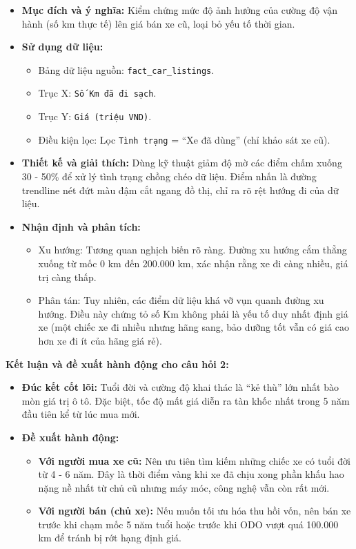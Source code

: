 \begin{itemize}
    \item \textbf{Mục đích và ý nghĩa:} Kiểm chứng mức độ ảnh hưởng của cường độ vận hành (số km thực tế) lên giá bán xe cũ, loại bỏ yếu tố thời gian.
    
    \item \textbf{Sử dụng dữ liệu:}
    \begin{itemize}
        \item Bảng dữ liệu nguồn: \texttt{fact\_car\_listings}.
        \item Trục X: \texttt{Số Km đã đi sạch}.
        \item Trục Y: \texttt{Giá (triệu VND)}.
        \item Điều kiện lọc: Lọc \texttt{Tình trạng} = ``Xe đã dùng'' (chỉ khảo sát xe cũ).
    \end{itemize}
    
    \item \textbf{Thiết kế và giải thích:} Dùng kỹ thuật giảm độ mờ các điểm chấm xuống 30 - 50\% để xử lý tình trạng chồng chéo dữ liệu. Điểm nhấn là đường trendline nét đứt màu đậm cắt ngang đồ thị, chỉ ra rõ rệt hướng đi của dữ liệu.
    
    \item \textbf{Nhận định và phân tích:}
    \begin{itemize}
        \item Xu hướng: Tương quan nghịch biến rõ ràng. Đường xu hướng cắm thẳng xuống từ mốc 0 km đến 200.000 km, xác nhận rằng xe đi càng nhiều, giá trị càng thấp.
        \item Phân tán: Tuy nhiên, các điểm dữ liệu khá vỡ vụn quanh đường xu hướng. Điều này chứng tỏ số Km không phải là yếu tố duy nhất định giá xe (một chiếc xe đi nhiều nhưng hãng sang, bảo dưỡng tốt vẫn có giá cao hơn xe đi ít của hãng giá rẻ).
    \end{itemize}
\end{itemize}

\noindent\textbf{Kết luận và đề xuất hành động cho câu hỏi 2:} 
\begin{itemize}
    \item \textbf{Đúc kết cốt lõi:} Tuổi đời và cường độ khai thác là ``kẻ thù'' lớn nhất bào mòn giá trị ô tô. Đặc biệt, tốc độ mất giá diễn ra tàn khốc nhất trong 5 năm đầu tiên kể từ lúc mua mới.
    \item \textbf{Đề xuất hành động:} 
    \begin{itemize}
        \item \textbf{Với người mua xe cũ:} Nên ưu tiên tìm kiếm những chiếc xe có tuổi đời từ 4 - 6 năm. Đây là thời điểm vàng khi xe đã chịu xong phần khấu hao nặng nề nhất từ chủ cũ nhưng máy móc, công nghệ vẫn còn rất mới.
        \item \textbf{Với người bán (chủ xe):} Nếu muốn tối ưu hóa thu hồi vốn, nên bán xe trước khi chạm mốc 5 năm tuổi hoặc trước khi ODO vượt quá 100.000 km để tránh bị rớt hạng định giá.
    \end{itemize}
\end{itemize}



